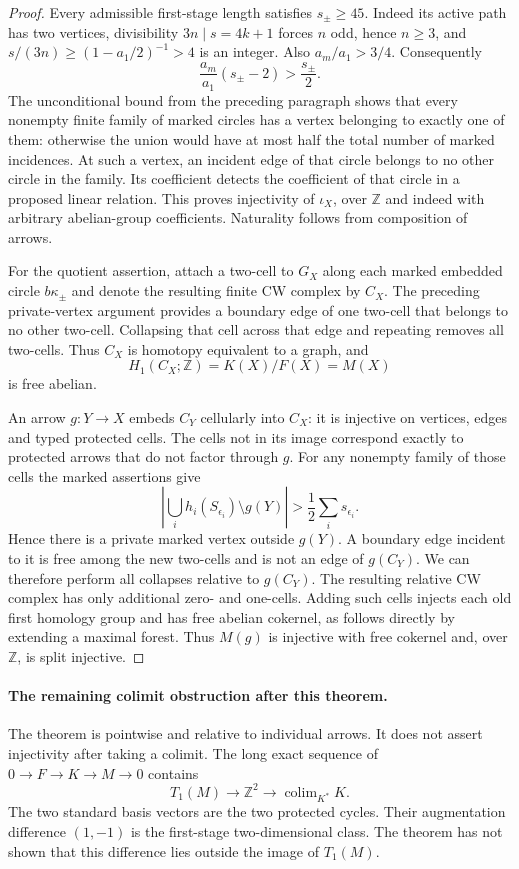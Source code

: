 \begin{proof}
Every admissible first-stage length satisfies $s_\pm\geq45$.
Indeed its active path has two vertices, divisibility
$3n\mid s=4k+1$ forces $n$ odd, hence $n\geq3$, and
$s/(3n)\geq(1-a_1/2)^{-1}>4$ is an integer. Also
$a_m/a_1>3/4$. Consequently
\[
 \frac{a_m}{a_1}(s_\pm-2)>\frac{s_\pm}{2}.
\]
The unconditional bound from the preceding paragraph shows that every
nonempty finite family of marked circles has a vertex belonging to
exactly one of them: otherwise the union would have at most half the
total number of marked incidences. At such a vertex, an incident edge
of that circle belongs to no other circle in the family. Its
coefficient detects the coefficient of that circle in a proposed
linear relation. This proves injectivity of $\iota_X$, over
$\mathbb Z$ and indeed with arbitrary abelian-group coefficients.
Naturality follows from composition of arrows.

For the quotient assertion, attach a two-cell to $G_X$ along each
marked embedded circle $b\kappa_\pm$ and denote the resulting finite
CW complex by $C_X$. The preceding private-vertex argument provides
a boundary edge of one two-cell that belongs to no other two-cell.
Collapsing that cell across that edge and repeating removes all
two-cells. Thus $C_X$ is homotopy equivalent to a graph, and
\[
 H_1(C_X;\mathbb Z)=K(X)/F(X)=M(X)
\]
is free abelian.

An arrow $g:Y\to X$ embeds $C_Y$ cellularly into $C_X$: it is
injective on vertices, edges and typed protected cells. The cells not
in its image correspond exactly to protected arrows that do not
factor through $g$. For any nonempty family of those cells the marked
assertions give
\[
 \left|\bigcup_i h_i(S_{\epsilon_i})\setminus g(Y)\right|
 >\frac12\sum_i s_{\epsilon_i}.
\]
Hence there is a private marked vertex outside $g(Y)$. A boundary
edge incident to it is free among the new two-cells and is not an
edge of $g(C_Y)$. We can therefore perform all collapses relative
to $g(C_Y)$. The resulting relative CW complex has only additional
zero- and one-cells. Adding such cells injects each old first homology
group and has free abelian cokernel, as follows directly by extending
a maximal forest. Thus $M(g)$ is injective with free cokernel and,
over $\mathbb Z$, is split injective.
\end{proof}

\paragraph{The remaining colimit obstruction after this theorem.}
The theorem is pointwise and relative to individual arrows. It does
not assert injectivity after taking a colimit. The long exact sequence
of $0\to F\to K\to M\to0$ contains
\[
 T_1(M)\longrightarrow\mathbb Z^2
 \longrightarrow\operatorname{colim}_{K^*}K.
\]
The two standard basis vectors are the two protected cycles. Their
augmentation difference $(1,-1)$ is the first-stage two-dimensional
class. The theorem has not shown that this difference lies outside
the image of $T_1(M)$.

